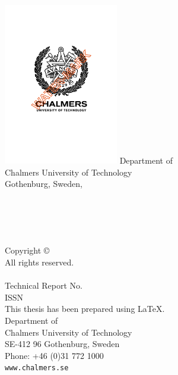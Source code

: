 \documentclass[
  paper=16.9cm:23.9cm,
  pagesize,
  twoside,
  10pt,
  chapterprefix,
  headsepline=on,
  footinclude=off,
  DIV=18,
  BCOR=7mm,
  bibliography=totoc,
  numbers=noenddot,
  open=right,
]{scrreprt}
\begin{document}
\noindent\begin{minipage}[b][4cm][t]{\textwidth}
    \begin{center}
    \includegraphics[width=5cm]{TemplateFiles/logos/title_page.jpg}
    \vfill
    Department of \TheDepartment \\
    Chalmers University of Technology \\
    Gothenburg, Sweden, \TheYear
    \end{center}
\end{minipage}
\newpage

\thispagestyle{empty}

\noindent\textbf{\ISSNPageTitle}\\
\ifdefined \ISSNPageSubitle \if \ISSNPageSubitle\empty\else
    \noindent\footnotesize\textit{\ISSNPageSubitle}\\
\fi\fi\\
{\textsc{\ISSNPageName}}
\vspace{4.0 cm}\\
Copyright \copyright~\TheYear~\textsc{\ISSNPageName}\\ All rights reserved.\\
\vspace{1.5 cm}\\
Technical Report No.~\TheReportNo \\
ISSN \TheISSN\\
\vspace{1 cm}%
This thesis has been prepared using \LaTeX.\\
Department of \TheDepartment \\
Chalmers University of Technology \\
SE-412 96 Gothenburg, Sweden \\
Phone: +46 (0)31 772 1000 \\
\texttt{www.chalmers.se} \\
\vfill
{}
\end{document}
